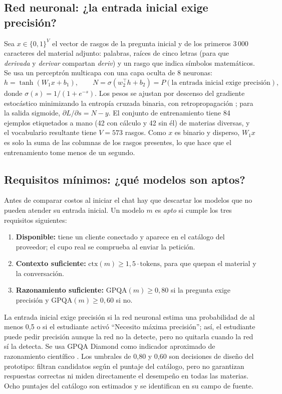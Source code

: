 \documentclass[12pt,letterpaper]{article}
\begin{document}
\subsection{Red neuronal: ¿la entrada inicial exige precisión?}
Sea $x\in\{0,1\}^V$ el vector de rasgos de la pregunta inicial y de los primeros 3\,000 caracteres del material adjunto: palabras, raíces de cinco letras (para que \emph{derivada} y \emph{derivar} compartan \emph{deriv}) y un rasgo que indica símbolos matemáticos. Se usa un perceptrón multicapa con una capa oculta de 8 neuronas:
\begin{equation}
h=\tanh(W_1x+b_1),\qquad N=\sigma(w_2^{\top}h+b_2)=P(\text{la entrada inicial exige precisión}),
\end{equation}
donde $\sigma(s)=1/(1+e^{-s})$. Los pesos se ajustan por descenso del gradiente estocástico minimizando la entropía cruzada binaria, con retropropagación \parencite{rumelhart1986}; para la salida sigmoide, $\partial L/\partial s = N-y$. El conjunto de entrenamiento tiene 84 ejemplos etiquetados a mano (42 con cálculo y 42 sin él) de materias diversas, y el vocabulario resultante tiene $V=573$ rasgos. Como $x$ es binario y disperso, $W_1x$ es solo la suma de las columnas de los rasgos presentes, lo que hace que el entrenamiento tome menos de un segundo.

\subsection{Requisitos mínimos: ¿qué modelos son aptos?}
Antes de comparar costos al iniciar el chat hay que descartar los modelos que no pueden atender su entrada inicial. Un modelo $m$ es \emph{apto} si cumple los tres requisitos siguientes:
\begin{enumerate}[nosep]
  \item \textbf{Disponible:} tiene un cliente conectado y aparece en el catálogo del proveedor; el cupo real se comprueba al enviar la petición.
  \item \textbf{Contexto suficiente:} $\mathrm{ctx}(m)\ge 1{,}5\cdot\text{tokens}$, para que quepan el material y la conversación.
  \item \textbf{Razonamiento suficiente:} $\mathrm{GPQA}(m)\ge 0{,}80$ si la pregunta exige precisión y $\mathrm{GPQA}(m)\ge 0{,}60$ si no.
\end{enumerate}
La entrada inicial exige precisión si la red neuronal estima una probabilidad de al menos 0,5 o si el estudiante activó \enquote{Necesito máxima precisión}; así, el estudiante puede pedir precisión aunque la red no la detecte, pero no quitarla cuando la red sí la detecta. Se usa GPQA Diamond como indicador aproximado de razonamiento científico \parencite{rein2023gpqa}. Los umbrales de 0,80 y 0,60 son decisiones de diseño del prototipo: filtran candidatos según el puntaje del catálogo, pero no garantizan respuestas correctas ni miden directamente el desempeño en todas las materias. Ocho puntajes del catálogo son estimados y se identifican en su campo de fuente.
\end{document}
